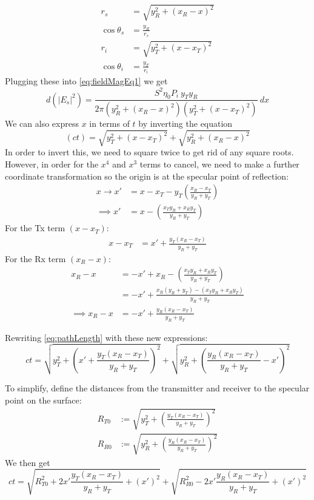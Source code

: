 \documentclass{article}
\begin{document}
\begin{align*}
   r_s &= \sqrt{y_R^2 + (x_R - x)^2} \\
   \cos \theta_s &= \frac{y_R}{r_s} \\
   r_i &= \sqrt{y_T^2 + (x - x_T)^2} \\
   \cos \theta_i &= \frac{y_T}{r_i}
\end{align*}
Plugging these into \eqref{eq:fieldMagEq1} we get
\begin{equation}
   d(|E_s|^2) = \frac{S^2 \eta_0 P_i \ y_T y_R }{2 \pi (y_R^2 + (x_R - x)^2) ( y_T^2
      + (x - x_T)^2)} \ dx
   \label{eq:localScaPow2dSetupParam}
\end{equation}
We can also express $x$ in terms of $t$ by inverting the equation
\begin{equation}
   (ct) = \sqrt{y_T^2 + (x - x_T)^2} + \sqrt{y_R^2 + (x_R - x)^2}
   \label{eq:pathLength}
\end{equation} 
In order to invert this, we need to square twice to get rid of any square roots.
However, in order for the $x^4$ and $x^3$ terms to cancel, we need to make a further
coordinate transformation so the origin is at the specular point of reflection: 
\begin{align}
   x \to x' &= x -x_T - y_T \left( \frac{x_R - x_T}{y_R + y_T} \right) \nonumber \\ 
   \implies x' &= x - \left( \frac{x_T y_R + x_R y_T}{y_R + y_T} \right)
   \label{eq:coordTrans}
\end{align}
For the Tx term $(x - x_T)$:
\begin{align}
   x - x_T &= x' + \frac{y_T(x_R - x_T)}{y_R + y_T}
\end{align}
For the Rx term $(x_R - x)$:
\begin{align}
   x_R - x &= -x' + x_R - \left(\frac{x_T y_R + x_R y_T}{y_R + y_T}\right) \nonumber
      \\
   &= -x' + \frac{x_R(y_R+y_T) - (x_T y_R + x_R y_T)}{y_R+y_T} \nonumber \\
   \implies x_R - x &= -x' + \frac{y_R(x_R - x_T)}{y_R + y_T}
\end{align}

Rewriting \eqref{eq:pathLength} with these new expressions:
\begin{equation*}
   ct = \sqrt{y_T^2 + \left(x' + \frac{y_T(x_R-x_T)}{y_R+y_T}\right)^2} + \sqrt{y_R^2
      + \left(\frac{y_R(x_R-x_T)}{y_R+y_T} - x'\right)^2}
\end{equation*}

To simplify, define the distances from the transmitter and receiver to the specular
point on the surface:
\begin{align*}
   R_{T0} &:= \sqrt{y_T^2 + \left(\frac{y_T(x_R-x_T)}{y_R+y_T}\right)^2} \\
   R_{R0} &:= \sqrt{y_R^2 + \left(\frac{y_R(x_R-x_T)}{y_R+y_T}\right)^2}
\end{align*}
We then get 
\begin{equation*}
   ct = \sqrt{R_{T0}^2 + 2x' \frac{y_T(x_R-x_T)}{y_R+y_T} + (x')^2} + \sqrt{R_{R0}^2
      - 2x' \frac{y_R(x_R-x_T)}{y_R+y_T} + (x')^2}
\end{equation*}
\end{document}
